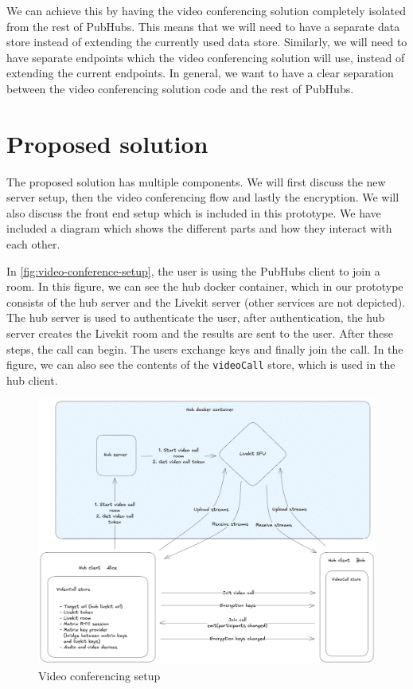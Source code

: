 \documentclass{report}
\begin{document}
We can achieve this by having the video conferencing solution completely isolated from the rest of PubHubs.
This means that we will need to have a separate data store instead of extending the currently used data store.
Similarly, we will need to have separate endpoints which the video conferencing solution will use,
instead of extending the current endpoints. In general, we want to have a clear separation between the video conferencing
solution code and the rest of PubHubs.

\chapter{Proposed solution}
The proposed solution has multiple components. We will first discuss the new server setup, then the video conferencing
flow and lastly the encryption. We will also discuss the front end setup which is included in this prototype. We have
included a diagram which shows the different parts
and how they interact with each other.

In \autoref{fig:video-conference-setup}, the user is using the PubHubs client to join a room. In this figure, we can see
the hub docker container, which in our prototype consists of the hub server and the Livekit server (other services
are not depicted). The hub server is used to authenticate the user, after authentication, the hub server creates the
Livekit room and the results are sent to the user. After these steps, the call can begin. The users exchange keys
and finally join the call. In the figure, we can also see the contents of the \lstinline[language=js]{videoCall}
store, which is used in the hub client.

\begin{figure}[!hbt]
\centering
\includegraphics[width=1\textwidth]{img/PH_videocall.excalidraw.png}
\caption{Video conferencing setup}
\label{fig:video-conference-setup}
\end{figure}
\end{document}
